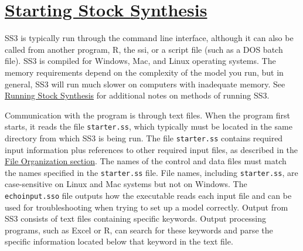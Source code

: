 \pagebreak

\hypertarget{StartingSS3}{}
\section[Starting Stock Synthesis]{\protect\hyperlink{StartingSS3}{Starting Stock Synthesis}}
SS3 is typically run through the command line interface, although it can also be called from another program, R, the \gls{ssi}, or a script file (such as a DOS batch file). SS3 is compiled for Windows, Mac, and Linux operating systems. The memory requirements depend on the complexity of the model you run, but in general, SS3 will run much slower on computers with inadequate memory. See \hyperref[sec:RunningSS3]{Running Stock Synthesis} for additional notes on methods of running SS3.

Communication with the program is through text files. When the program first starts, it reads the file \verb|starter.ss|, which typically must be located in the same directory from which SS3 is being run. The file \verb|starter.ss| contains required input information plus references to other required input files, as described in the \hyperref[FileOrganization]{File Organization section}. The names of the control and data files must match the names specified in the \verb|starter.ss| file. File names, including \verb|starter.ss|, are case-sensitive on Linux and Mac systems but not on Windows. The \verb|echoinput.sso| file outputs how the executable reads each input file and can be used for troubleshooting when trying to set up a model correctly. Output from SS3 consists of text files containing specific keywords. Output processing programs, such as Excel or R, can search for these keywords and parse the specific information located below that keyword in the text file.

\pagebreak
